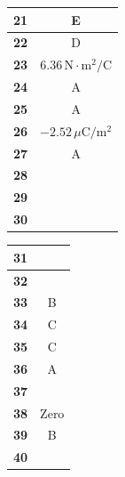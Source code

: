 \begin{enumerate}
\begin{multicols}{4}
\begin{table}[H]
\begin{tabular}{|c|c|}
\hline
\textbf{21}  & E \\ \hline
\textbf{22}  & D \\ \hline
\textbf{23}  & $6.36\,\text{N}\cdot\text{m}^2/\text{C}$ \\ \hline
\textbf{24}  & A \\ \hline
\textbf{25}  & A \\ \hline
\textbf{26}  & $-2.52\,\mu\text{C}/\text{m}^2$ \\ \hline
\textbf{27}  & A \\ \hline
\textbf{28}  &  \\ \hline
\textbf{29}  &  \\ \hline
\textbf{30} &  \\ \hline
\end{tabular}
\end{table}

\begin{table}[H]
\begin{tabular}{|c|c|}
\hline
\textbf{31}  &  \\ \hline
\textbf{32}  &  \\ \hline
\textbf{33}  & B \\ \hline
\textbf{34}  & C \\ \hline
\textbf{35}  & C \\ \hline
\textbf{36}  & A \\ \hline
\textbf{37}  &  \\ \hline
\textbf{38}  & Zero \\ \hline
\textbf{39}  & B \\ \hline
\textbf{40} &  \\ \hline
\end{tabular}
\end{table}
\end{multicols}

\end{enumerate}


